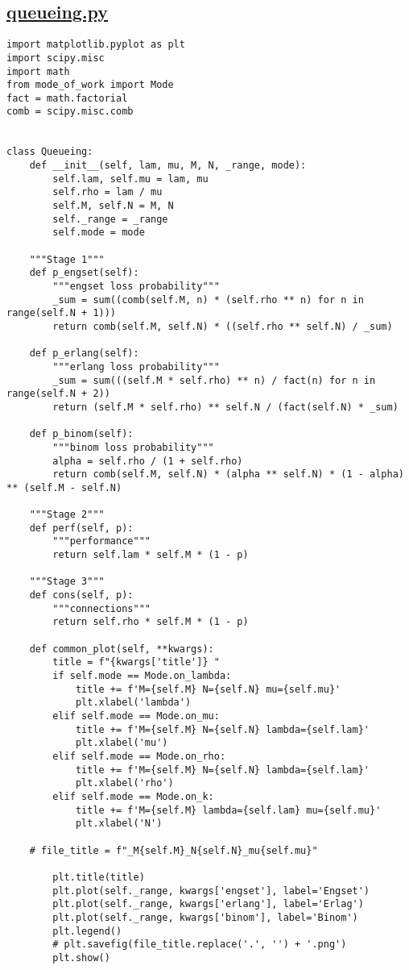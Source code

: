 \documentclass[12pt]{article}
\newcommand\purl[1]{\protect\url{#1}} %
\begin{document}
\subsection{\purl{queueing.py}}
\begin{lstlisting}
import matplotlib.pyplot as plt
import scipy.misc
import math
from mode_of_work import Mode
fact = math.factorial
comb = scipy.misc.comb


class Queueing:
    def __init__(self, lam, mu, M, N, _range, mode):
        self.lam, self.mu = lam, mu
        self.rho = lam / mu
        self.M, self.N = M, N
        self._range = _range
        self.mode = mode

    """Stage 1"""
    def p_engset(self):
        """engset loss probability"""
        _sum = sum((comb(self.M, n) * (self.rho ** n) for n in range(self.N + 1)))
        return comb(self.M, self.N) * ((self.rho ** self.N) / _sum)

    def p_erlang(self):
        """erlang loss probability"""
        _sum = sum(((self.M * self.rho) ** n) / fact(n) for n in range(self.N + 2))
        return (self.M * self.rho) ** self.N / (fact(self.N) * _sum)

    def p_binom(self):
        """binom loss probability"""
        alpha = self.rho / (1 + self.rho)
        return comb(self.M, self.N) * (alpha ** self.N) * (1 - alpha) ** (self.M - self.N)

    """Stage 2"""
    def perf(self, p):
        """performance"""
        return self.lam * self.M * (1 - p)

    """Stage 3"""
    def cons(self, p):
        """connections"""
        return self.rho * self.M * (1 - p)

    def common_plot(self, **kwargs):
        title = f"{kwargs['title']} "
        if self.mode == Mode.on_lambda:
            title += f'M={self.M} N={self.N} mu={self.mu}'
            plt.xlabel('lambda')
        elif self.mode == Mode.on_mu:
            title += f'M={self.M} N={self.N} lambda={self.lam}'
            plt.xlabel('mu')
        elif self.mode == Mode.on_rho:
            title += f'M={self.M} N={self.N} lambda={self.lam}'
            plt.xlabel('rho')
        elif self.mode == Mode.on_k:
            title += f'M={self.M} lambda={self.lam} mu={self.mu}'
            plt.xlabel('N')

    # file_title = f"_M{self.M}_N{self.N}_mu{self.mu}"

        plt.title(title)
        plt.plot(self._range, kwargs['engset'], label='Engset')
        plt.plot(self._range, kwargs['erlang'], label='Erlag')
        plt.plot(self._range, kwargs['binom'], label='Binom')
        plt.legend()
        # plt.savefig(file_title.replace('.', '') + '.png')
        plt.show()
\end{lstlisting}
\end{document}
